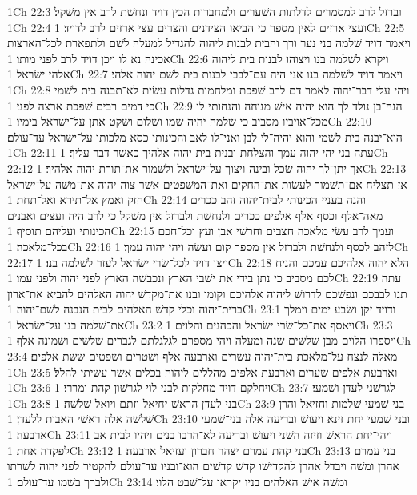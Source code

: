 1Ch 22:3  וברזל לרב למסמרים לדלתות השׁערים ולמחברות הכין דויד ונחשׁת לרב אין משׁקל׃
1Ch 22:4  ועצי ארזים לאין מספר כי הביאו הצידנים והצרים עצי ארזים לרב לדויד׃
1Ch 22:5  ויאמר דויד שׁלמה בני נער ורך והבית לבנות ליהוה להגדיל למעלה לשׁם ולתפארת לכל־הארצות אכינה נא לו ויכן דויד לרב לפני מותו׃
1Ch 22:6  ויקרא לשׁלמה בנו ויצוהו לבנות בית ליהוה אלהי ישׂראל׃
1Ch 22:7  ויאמר דויד לשׁלמה בנו אני היה עם־לבבי לבנות בית לשׁם יהוה אלהי׃
1Ch 22:8  ויהי עלי דבר־יהוה לאמר דם לרב שׁפכת ומלחמות גדלות עשׂית לא־תבנה בית לשׁמי כי דמים רבים שׁפכת ארצה לפני׃
1Ch 22:9  הנה־בן נולד לך הוא יהיה אישׁ מנוחה והנחותי לו מכל־אויביו מסביב כי שׁלמה יהיה שׁמו ושׁלום ושׁקט אתן על־ישׂראל בימיו׃
1Ch 22:10  הוא־יבנה בית לשׁמי והוא יהיה־לי לבן ואני־לו לאב והכינותי כסא מלכותו על־ישׂראל עד־עולם׃
1Ch 22:11  עתה בני יהי יהוה עמך והצלחת ובנית בית יהוה אלהיך כאשׁר דבר עליך׃
1Ch 22:12  אך יתן־לך יהוה שׂכל ובינה ויצוך על־ישׂראל ולשׁמור את־תורת יהוה אלהיך׃
1Ch 22:13  אז תצליח אם־תשׁמור לעשׂות את־החקים ואת־המשׁפטים אשׁר צוה יהוה את־משׁה על־ישׂראל חזק ואמץ אל־תירא ואל־תחת׃
1Ch 22:14  והנה בעניי הכינותי לבית־יהוה זהב ככרים מאה־אלף וכסף אלף אלפים ככרים ולנחשׁת ולברזל אין משׁקל כי לרב היה ועצים ואבנים הכינותי ועליהם תוסיף׃
1Ch 22:15  ועמך לרב עשׂי מלאכה חצבים וחרשׁי אבן ועץ וכל־חכם בכל־מלאכה׃
1Ch 22:16  לזהב לכסף ולנחשׁת ולברזל אין מספר קום ועשׂה ויהי יהוה עמך׃
1Ch 22:17  ויצו דויד לכל־שׂרי ישׂראל לעזר לשׁלמה בנו׃
1Ch 22:18  הלא יהוה אלהיכם עמכם והניח לכם מסביב כי נתן בידי את ישׁבי הארץ ונכבשׁה הארץ לפני יהוה ולפני עמו׃
1Ch 22:19  עתה תנו לבבכם ונפשׁכם לדרושׁ ליהוה אלהיכם וקומו ובנו את־מקדשׁ יהוה האלהים להביא את־ארון ברית־יהוה וכלי קדשׁ האלהים לבית הנבנה לשׁם־יהוה׃
1Ch 23:1  ודויד זקן ושׂבע ימים וימלך את־שׁלמה בנו על־ישׂראל׃
1Ch 23:2  ויאסף את־כל־שׂרי ישׂראל והכהנים והלוים׃
1Ch 23:3  ויספרו הלוים מבן שׁלשׁים שׁנה ומעלה ויהי מספרם לגלגלתם לגברים שׁלשׁים ושׁמונה אלף׃
1Ch 23:4  מאלה לנצח על־מלאכת בית־יהוה עשׂרים וארבעה אלף ושׁטרים ושׁפטים שׁשׁת אלפים׃
1Ch 23:5  וארבעת אלפים שׁערים וארבעת אלפים מהללים ליהוה בכלים אשׁר עשׂיתי להלל׃
1Ch 23:6  ויחלקם דויד מחלקות לבני לוי לגרשׁון קהת ומררי׃
1Ch 23:7  לגרשׁני לעדן ושׁמעי׃
1Ch 23:8  בני לעדן הראשׁ יחיאל וזתם ויואל שׁלשׁה׃
1Ch 23:9  בני שׁמעי שׁלמות וחזיאל והרן שׁלשׁה אלה ראשׁי האבות ללעדן׃
1Ch 23:10  ובני שׁמעי יחת זינא ויעושׁ ובריעה אלה בני־שׁמעי ארבעה׃
1Ch 23:11  ויהי־יחת הראשׁ וזיזה השׁני ויעושׁ ובריעה לא־הרבו בנים ויהיו לבית אב לפקדה אחת׃
1Ch 23:12  בני קהת עמרם יצהר חברון ועזיאל ארבעה׃
1Ch 23:13  בני עמרם אהרן ומשׁה ויבדל אהרן להקדישׁו קדשׁ קדשׁים הוא־ובניו עד־עולם להקטיר לפני יהוה לשׁרתו ולברך בשׁמו עד־עולם׃
1Ch 23:14  ומשׁה אישׁ האלהים בניו יקראו על־שׁבט הלוי׃
